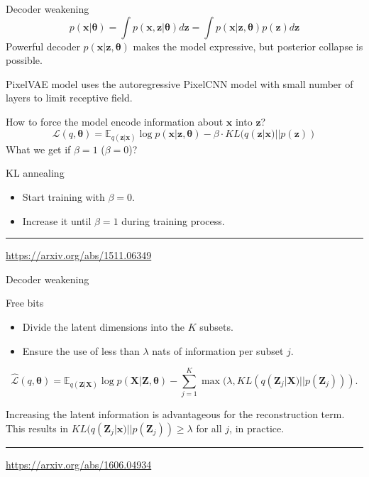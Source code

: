 \documentclass{beamer}
\newcommand{\bx}{\mathbf{x}}
\newcommand{\bz}{\mathbf{z}}
\newcommand{\bX}{\mathbf{X}}
\newcommand{\bZ}{\mathbf{Z}}
\newcommand{\btheta}{\boldsymbol{\theta}}
\begin{document}
\begin{frame}{Decoder weakening}
	\[
		p(\bx | \btheta) = \int p(\bx, \bz | \btheta) d \bz = \int p(\bx | \bz, \btheta) p(\bz) d \bz 
	\]
	Powerful decoder $p(\bx | \bz, \btheta)$ makes the model expressive, but posterior collapse is possible.
	
	PixelVAE model uses the autoregressive PixelCNN model with small number of layers to limit receptive field.
	
	How to force the model encode information about $\bx$ into $\bz$?
	\[
	    \mathcal{L}(q, \btheta) = \mathbb{E}_{q(\bz | \bx)} \log p(\bx | \bz, \btheta) - \beta \cdot KL (q(\bz | \bx) || p(\bz))
	\]
	What we get if $\beta = 1$ ($\beta = 0$)? \\
	
	\begin{block}{KL annealing}
		\begin{itemize}
		    \item Start training with $\beta = 0$.
		    \item Increase it until $\beta = 1$ during training process.
		\end{itemize}
	\end{block}
	\vfill
	\hrule\medskip
	{\scriptsize \href{https://arxiv.org/abs/1511.06349}{https://arxiv.org/abs/1511.06349}}
\end{frame}
\begin{frame}{Decoder weakening}
\begin{block}{Free bits}
\begin{itemize}
\item Divide the latent dimensions into the $K$ subsets.
\item Ensure the use of less than $\lambda$ nats of information per subset $j$.
\end{itemize}

\[
    \hat{\mathcal{L}}(q, \btheta) = \mathbb{E}_{q(\bZ | \bX)} \log p(\bX | \bZ, \btheta) - \sum_{j=1}^K \max(\lambda, KL (q(\bZ_j | \bX) || p(\bZ_j))).
\]

Increasing the latent information is advantageous for the reconstruction term. \\
\vspace{0.2cm}
This results in $KL (q(\bZ_j | \bx) || p(\bZ_j)) \geq \lambda$ for all $j$, in practice.
\end{block}
\vspace{1cm}
\vfill
\hrule\medskip
{\scriptsize \href{https://arxiv.org/abs/1606.04934}{https://arxiv.org/abs/1606.04934}}
\end{frame}
\end{document}
